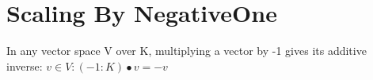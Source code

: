 \section{Scaling By NegativeOne}

\begin{theorem}
  \label{theorem : neg_one_smul}
  \leanok
  In any vector space V over K, multiplying a vector by -1 gives its additive inverse: $v \in V: (-1 : K) \bullet v = -v$
\end{theorem}
